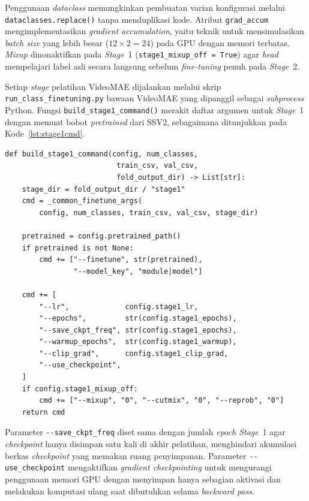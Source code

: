 Penggunaan \textit{dataclass} memungkinkan pembuatan varian konfigurasi melalui \texttt{dataclasses.replace()} tanpa menduplikasi kode. Atribut \texttt{grad\_accum} mengimplementasikan \textit{gradient accumulation}, yaitu teknik untuk mensimulasikan \textit{batch size} yang lebih besar ($12 \times 2 = 24$) pada GPU dengan memori terbatas. \textit{Mixup} dinonaktifkan pada \textit{Stage}~1 (\texttt{stage1\_mixup\_off = True}) agar \textit{head} mempelajari label asli secara langsung sebelum \textit{fine-tuning} penuh pada \textit{Stage}~2.\par

Setiap \textit{stage} pelatihan VideoMAE dijalankan melalui skrip \texttt{run\_class\_finetuning.py} bawaan VideoMAE yang dipanggil sebagai \textit{subprocess} Python. Fungsi \texttt{build\_stage1\_command()} merakit daftar argumen untuk \textit{Stage}~1 dengan memuat bobot \textit{pretrained} dari SSV2, sebagaimana ditunjukkan pada Kode~\ref{lst:stage1cmd}.\par

\begin{lstlisting}[caption={Kode pembangunan perintah \textit{Stage} 1 VideoMAE}, label={lst:stage1cmd}]
def build_stage1_command(config, num_classes,
                          train_csv, val_csv,
                          fold_output_dir) -> List[str]:
    stage_dir = fold_output_dir / "stage1"
    cmd = _common_finetune_args(
        config, num_classes, train_csv, val_csv, stage_dir)

    pretrained = config.pretrained_path()
    if pretrained is not None:
        cmd += ["--finetune", str(pretrained),
                "--model_key", "module|model"]

    cmd += [
        "--lr",             config.stage1_lr,
        "--epochs",         str(config.stage1_epochs),
        "--save_ckpt_freq", str(config.stage1_epochs),
        "--warmup_epochs",  str(config.stage1_warmup),
        "--clip_grad",      config.stage1_clip_grad,
        "--use_checkpoint",
    ]
    if config.stage1_mixup_off:
        cmd += ["--mixup", "0", "--cutmix", "0", "--reprob", "0"]
    return cmd
\end{lstlisting}

Parameter \texttt{-{}-save\_ckpt\_freq} diset sama dengan jumlah \textit{epoch Stage}~1 agar \textit{checkpoint} hanya disimpan satu kali di akhir pelatihan, menghindari akumulasi berkas \textit{checkpoint} yang memakan ruang penyimpanan. Parameter \texttt{-{}-use\_checkpoint} mengaktifkan \textit{gradient checkpointing} untuk mengurangi penggunaan memori GPU dengan menyimpan hanya sebagian aktivasi dan melakukan komputasi ulang saat dibutuhkan selama \textit{backward pass}.\par

